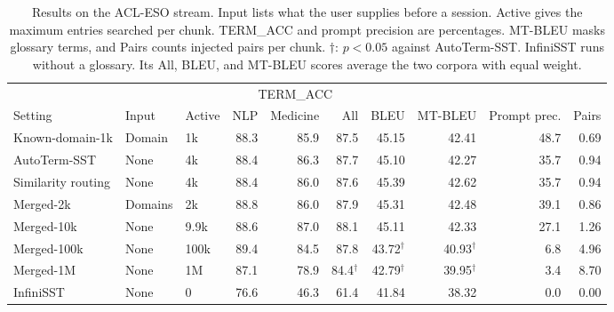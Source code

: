 \begin{table}[t]
\centering
\footnotesize
\setlength{\tabcolsep}{4pt}
\begin{tabular}{lllrrrrrrr}
\toprule
& & & \multicolumn{3}{c}{TERM\_ACC} & & & & \\
\cmidrule(lr){4-6}
Setting & Input & Active & NLP & Medicine & All & BLEU & MT-BLEU & Prompt prec. & Pairs \\
\midrule
Known-domain-1k & Domain & 1k & 88.3 & 85.9 & 87.5 & 45.15 & 42.41 & 48.7 & 0.69 \\
AutoTerm-SST & None & 4k & 88.4 & 86.3 & 87.7 & 45.10 & 42.27 & 35.7 & 0.94 \\
Similarity routing & None & 4k & 88.4 & 86.0 & 87.6 & 45.39 & 42.62 & 35.7 & 0.94 \\
Merged-2k & Domains & 2k & 88.8 & 86.0 & 87.9 & 45.31 & 42.48 & 39.1 & 0.86 \\
Merged-10k & None & 9.9k & 88.6 & 87.0 & 88.1 & 45.11 & 42.33 & 27.1 & 1.26 \\
Merged-100k & None & 100k & 89.4 & 84.5 & 87.8 & 43.72$^\dagger$ & 40.93$^\dagger$ & 6.8 & 4.96 \\
Merged-1M & None & 1M & 87.1 & 78.9 & 84.4$^\dagger$ & 42.79$^\dagger$ & 39.95$^\dagger$ & 3.4 & 8.70 \\
\midrule
InfiniSST & None & 0 & 76.6 & 46.3 & 61.4 & 41.84 & 38.32 & 0.0 & 0.00 \\
\bottomrule
\end{tabular}
\caption{Results on the ACL-ESO stream. Input lists what the user supplies before a
session. Active gives the maximum entries searched per chunk. TERM\_ACC and prompt
precision are percentages. MT-BLEU masks glossary terms, and Pairs counts injected
pairs per chunk. $\dagger$: $p<0.05$ against AutoTerm-SST. InfiniSST runs without a
glossary. Its All, BLEU, and MT-BLEU scores average the two corpora with equal
weight.}
\label{tab:quality}
\end{table}

